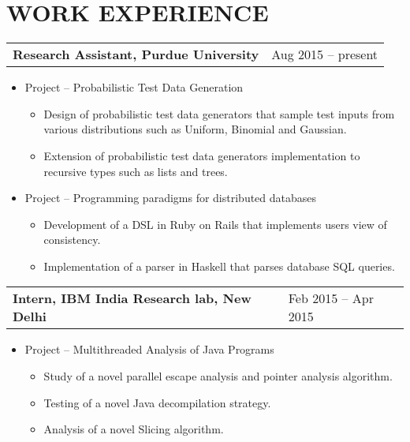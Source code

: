 \documentclass[10pt]{article}
\begin{document}
\section*{WORK EXPERIENCE}

{\setlength{\tabcolsep}{40pt}
\hspace{-1.5cm}
\begin{tabular}{ll}
{\bf Research Assistant, Purdue University}		& Aug 2015 -- present	\\
\end{tabular}
}
\vspace{-0.2cm}
\begin{itemize}
\itemsep-0.5em
\item Project – Probabilistic Test Data Generation
	\vspace{-0.2cm}
	\begin{itemize}
	\itemsep-0.2em
	\item Design of probabilistic test data generators that sample 
		test inputs from various distributions such as Uniform, Binomial and Gaussian.
	\item Extension of probabilistic test data generators implementation to recursive types such as lists and trees.
	\end{itemize}


\item Project – Programming paradigms for distributed databases
	\vspace{-0.2cm}
	\begin{itemize}
	\itemsep-0.2em
	\item Development of a DSL in Ruby on Rails that implements users view of consistency.
	\item Implementation of a parser in Haskell that parses database SQL queries.
	\end{itemize}
\end{itemize}


{\setlength{\tabcolsep}{27pt}
\hspace{-1.5cm}
\begin{tabular}{ll}
{\bf Intern, IBM India Research lab, New Delhi}		& Feb 2015 -- Apr 2015	\\
\end{tabular}
}
\vspace{-0.2cm}
\begin{itemize}
\item Project -- Multithreaded Analysis of Java Programs
	\vspace{-0.2cm}
	\begin{itemize}
	\itemsep-0.2em
	\item Study of a novel parallel escape analysis and pointer analysis algorithm.
	\item Testing of a novel Java decompilation strategy.
	\item Analysis of a novel Slicing algorithm.	
	\end{itemize}
\end{itemize}
\end{document}
